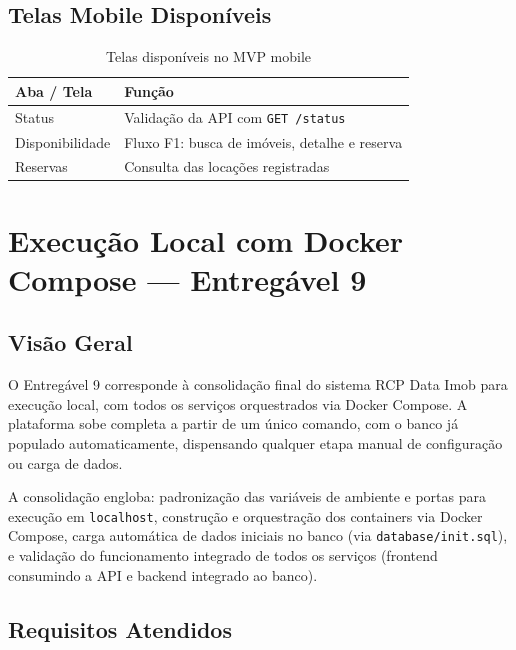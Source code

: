 \documentclass[12pt, a4paper]{article}
\newcommand{\thead}[1]{\cellcolor{tableheader}\color{white}\bfseries #1}
\newcommand{\talt}{\rowcolor{tablerowalt}}
\begin{document}
\subsection{Telas Mobile Disponíveis}

\begin{table}[H]
\centering
\begin{tabularx}{\textwidth}{|l|X|}
\hline
\thead{Aba / Tela} & \thead{Função} \\
\hline
Status & Validação da API com \texttt{GET /status} \\
\talt Disponibilidade & Fluxo F1: busca de imóveis, detalhe e reserva \\
Reservas & Consulta das locações registradas \\
\hline
\end{tabularx}
\caption{Telas disponíveis no MVP mobile}
\end{table}
\section{Execução Local com Docker Compose — Entregável 9}
\subsection{Visão Geral}

O Entregável 9 corresponde à consolidação final do sistema RCP Data Imob para execução local,
com todos os serviços orquestrados via Docker Compose. A plataforma sobe completa a partir de um
único comando, com o banco já populado automaticamente, dispensando qualquer etapa manual de
configuração ou carga de dados.

A consolidação engloba: padronização das variáveis de ambiente e portas para execução em
\texttt{localhost}, construção e orquestração dos containers via Docker Compose, carga automática
de dados iniciais no banco (via \texttt{database/init.sql}), e validação do funcionamento integrado
de todos os serviços (frontend consumindo a API e backend integrado ao banco).

\subsection{Requisitos Atendidos}
\end{document}
